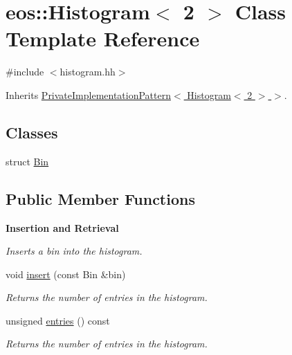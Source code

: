 \hypertarget{classeos_1_1Histogram_3_012_01_4}{
\section{eos::Histogram$<$ 2 $>$ Class Template Reference}
\label{classeos_1_1Histogram_3_012_01_4}
}


{\ttfamily \#include $<$histogram.hh$>$}

Inherits \hyperlink{classeos_1_1PrivateImplementationPattern}{PrivateImplementationPattern$<$ Histogram$<$ 2 $>$ $>$}.\subsection*{Classes}
\begin{DoxyCompactItemize}
\item 
struct \hyperlink{structeos_1_1Histogram_3_012_01_4_1_1Bin}{Bin}
\end{DoxyCompactItemize}
\subsection*{Public Member Functions}
\begin{Indent}{\bf Insertion and Retrieval}\par
{\em \label{_amgrp1fa92f5fa236ed95d2fd750c3379ff61}
 Inserts a bin into the histogram. }\begin{DoxyCompactItemize}
\item 
void \hyperlink{classeos_1_1Histogram_3_012_01_4_a28aa2e33aa1e9b3dc90e02a7ea138dcf}{insert} (const Bin \&bin)
\begin{DoxyCompactList}\small\item\em Returns the number of entries in the histogram. \item\end{DoxyCompactList}\item 
unsigned \hyperlink{classeos_1_1Histogram_3_012_01_4_a34387612b5d49dc13d7ab62c35d6f806}{entries} () const 
\begin{DoxyCompactList}\small\item\em Returns the number of entries in the histogram. \item\end{DoxyCompactList}\end{DoxyCompactItemize}
\end{Indent}
